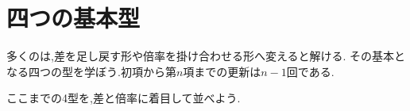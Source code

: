 
\section{四つの基本型}\label{節：基本4パターン}

  多くのは,差を足し戻す形や倍率を掛け合わせる形へ変えると解ける.
  その基本となる四つの型を学ぼう.初項から第$n$項までの更新は$n-1$回である.





  ここまでの4型を,差と倍率に着目して並べよう.
  \BookFigBasicFour
